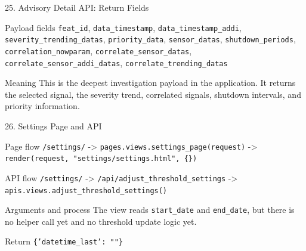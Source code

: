 \documentclass[aspectratio=169]{beamer}
\begin{document}
\begin{frame}{25. Advisory Detail API: Return Fields}
\justifying
\begin{block}{Payload fields}
\small
\texttt{feat\_id}, \texttt{data\_timestamp}, \texttt{data\_timestamp\_addi}, \texttt{severity\_trending\_datas}, \texttt{priority\_data}, \texttt{sensor\_datas}, \texttt{shutdown\_periods}, \texttt{correlation\_nowparam}, \texttt{correlate\_sensor\_datas}, \texttt{correlate\_sensor\_addi\_datas}, \texttt{correlate\_trending\_datas}
\end{block}

\begin{block}{Meaning}
This is the deepest investigation payload in the application.
It returns the selected signal, the severity trend, correlated signals,
shutdown intervals, and priority information.
\end{block}
\end{frame}

\begin{frame}{26. Settings Page and API}
\justifying
\begin{block}{Page flow}
\texttt{/settings/} -> \texttt{pages.views.settings\_page(request)} ->
\texttt{render(request, "settings/settings.html", \{\})}
\end{block}

\begin{block}{API flow}
\texttt{/settings/} -> \texttt{/api/adjust\_threshold\_settings} ->
\texttt{apis.views.adjust\_threshold\_settings()}
\end{block}

\begin{block}{Arguments and process}
The view reads \texttt{start\_date} and \texttt{end\_date}, but there is no helper call yet and no threshold update logic yet.
\end{block}

\begin{block}{Return}
\texttt{\{'datetime\_last': ""\}}
\end{block}
\end{frame}
\end{document}
